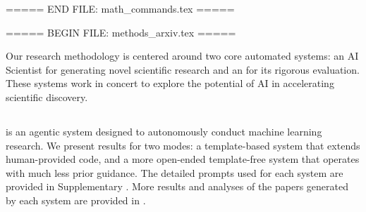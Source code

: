 \newcommand{\pmodel}{p_{\rm{model}}}
\newcommand{\Pmodel}{P_{\rm{model}}}
\newcommand{\ptildemodel}{\tilde{p}_{\rm{model}}}

\newcommand{\pencode}{p_{\rm{encoder}}}
\newcommand{\pdecode}{p_{\rm{decoder}}}
\newcommand{\precons}{p_{\rm{reconstruct}}}
\newcommand{\E}{\mathbb{E}}
\newcommand{\Ls}{\mathcal{L}}
\newcommand{\R}{\mathbb{R}}
\newcommand{\emp}{\tilde{p}}
\newcommand{\lr}{\alpha}
\newcommand{\reg}{\lambda}
\newcommand{\rect}{\mathrm{rectifier}}
\newcommand{\softmax}{\mathrm{softmax}}
\newcommand{\sigmoid}{\sigma}
\newcommand{\softplus}{\zeta}
\newcommand{\KL}{D_{\mathrm{KL}}}
\newcommand{\Var}{\mathrm{Var}}
\newcommand{\standarderror}{\mathrm{SE}}
\newcommand{\Cov}{\mathrm{Cov}}



\newcommand{\normlzero}{L^0}
\newcommand{\normlone}{L^1}
\newcommand{\normltwo}{L^2}
\newcommand{\normlp}{L^p}
\newcommand{\normmax}{L^\infty}

\newcommand{\parents}{Pa}

\DeclareMathOperator*{\argmax}{arg\,max}
\DeclareMathOperator*{\argmin}{arg\,min}

\DeclareMathOperator{\sign}{sign}
\DeclareMathOperator{\Tr}{Tr}
\let\ab\allowbreak
===== END FILE: math_commands.tex =====

===== BEGIN FILE: methods_arxiv.tex =====


Our research methodology is centered around two core automated systems: an AI Scientist for generating novel scientific research and an \ourreviewer for its rigorous evaluation. These systems work in concert to explore the potential of AI in accelerating scientific discovery.

\subsection*{\ouralgo}
\ouralgo is an agentic system designed to autonomously conduct machine learning research. We present results for two modes: a template-based system that extends human-provided code, and a more open-ended template-free system that operates with much less prior guidance.
The detailed prompts used for each system are provided in Supplementary . More results and analyses of the papers generated by each system are provided in .

